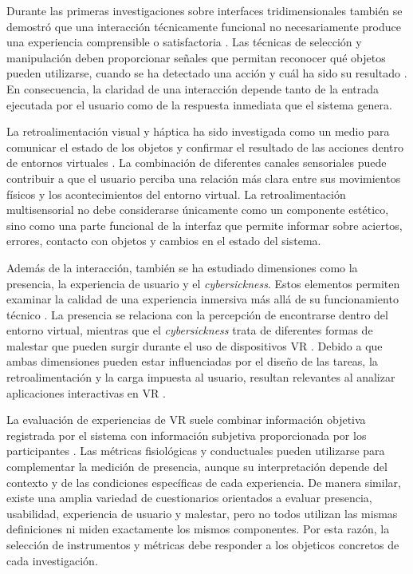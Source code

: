Durante las primeras investigaciones sobre 
interfaces tridimensionales también se demostró 
que una interacción técnicamente funcional no 
necesariamente produce una experiencia 
comprensible o satisfactoria \cite{yeo2024interfaces}.
Las técnicas de selección y manipulación deben 
proporcionar señales que permitan reconocer qué 
objetos pueden utilizarse, cuando se ha detectado 
una acción y cuál ha sido su resultado \cite{chen2024interfaces}.
En consecuencia, la claridad de una interacción 
depende tanto de la entrada ejecutada por el 
usuario como de la respuesta inmediata que el 
sistema genera.

La retroalimentación visual y háptica ha sido 
investigada como un medio para comunicar el 
estado de los objetos y confirmar el resultado de 
las acciones dentro de entornos virtuales \cite{chen2024interfaces,gibbs2022feedback}.
La combinación de diferentes canales sensoriales puede contribuir a que 
el usuario perciba una relación más clara entre sus movimientos físicos 
y los acontecimientos del entorno virtual. La retroalimentación 
multisensorial no debe considerarse únicamente como un componente 
estético, sino como una parte funcional de la interfaz que permite 
informar sobre aciertos, errores, contacto con objetos y cambios en el 
estado del sistema.

Además de la interacción, también se ha estudiado dimensiones como la 
presencia, la experiencia de usuario y el \textit{cybersickness}. Estos 
elementos permiten examinar la calidad de una experiencia inmersiva más 
allá de su funcionamiento técnico \cite{wang2025presence,bareisyte2024questionnaires}.
La presencia se relaciona con la percepción de encontrarse dentro del 
entorno virtual, mientras que el \textit{cybersickness} trata de 
diferentes formas de malestar que pueden surgir durante el uso de 
dispositivos VR \cite{sepich2022workload}. Debido a que ambas 
dimensiones pueden estar influenciadas por el diseño de las tareas, la 
retroalimentación y la carga impuesta al usuario, resultan relevantes al 
analizar aplicaciones interactivas en VR \cite{gibbs2022feedback}.

La evaluación de experiencias de VR suele combinar información objetiva 
registrada por el sistema con información subjetiva proporcionada por 
los participantes \cite{wang2025presence,bareisyte2024questionnaires}.
Las métricas fisiológicas y conductuales pueden utilizarse para 
complementar la medición de presencia, aunque su interpretación depende 
del contexto y de las condiciones específicas de cada experiencia. De 
manera similar, existe una amplia variedad de cuestionarios orientados a 
evaluar presencia, usabilidad, experiencia de usuario y malestar, pero 
no todos utilizan las mismas definiciones ni miden exactamente los 
mismos componentes. Por esta razón, la selección de instrumentos y 
métricas debe responder a los objeticos concretos de cada investigación.

